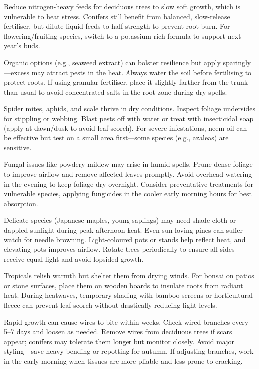 \medskip  
{}  
\noindent  
Reduce nitrogen\--heavy feeds for deciduous trees to slow soft growth, which is vulnerable to heat stress.
Conifers still benefit from balanced, slow\--release fertiliser, but dilute liquid feeds to half\--strength to prevent root burn.
For flowering/fruiting species, switch to a potassium\--rich formula to support next year's buds.

Organic options (e.g., seaweed extract) can bolster resilience but apply sparingly---excess may attract pests in the heat.
Always water the soil before fertilising to protect roots.
If using granular fertiliser, place it slightly farther from the trunk than usual to avoid concentrated salts in the root zone during dry spells.

\medskip
{}  
\noindent  
Spider mites, aphids, and scale thrive in dry conditions.
Inspect foliage undersides for stippling or webbing.
Blast pests off with water or treat with insecticidal soap (apply at dawn/dusk to avoid leaf scorch).
For severe infestations, neem oil can be effective but test on a small area first---some species (e.g., azaleas) are sensitive.

Fungal issues like powdery mildew may arise in humid spells.
Prune dense foliage to improve airflow and remove affected leaves promptly.
Avoid overhead watering in the evening to keep foliage dry overnight.
Consider preventative treatments for vulnerable species, applying fungicides in the cooler early morning hours for best absorption.

\medskip  
{}  
\noindent  
Delicate species (Japanese maples, young saplings) may need shade cloth or dappled sunlight during peak afternoon heat.
Even sun\--loving pines can suffer---watch for needle browning.
Light\--coloured pots or stands help reflect heat, and elevating pots improves airflow.
Rotate trees periodically to ensure all sides receive equal light and avoid lopsided growth.

Tropicals relish warmth but shelter them from drying winds.
For bonsai on patios or stone surfaces, place them on wooden boards to insulate roots from radiant heat.
During heatwaves, temporary shading with bamboo screens or horticultural fleece can prevent leaf scorch without drastically reducing light levels.

\medskip  
{}  
\noindent  
Rapid growth can cause wires to bite within weeks.
Check wired branches every 5–7 days and loosen as needed.
Remove wires from deciduous trees if scars appear; conifers may tolerate them longer but monitor closely.
Avoid major styling---save heavy bending or repotting for autumn.
If adjusting branches, work in the early morning when tissues are more pliable and less prone to cracking.

